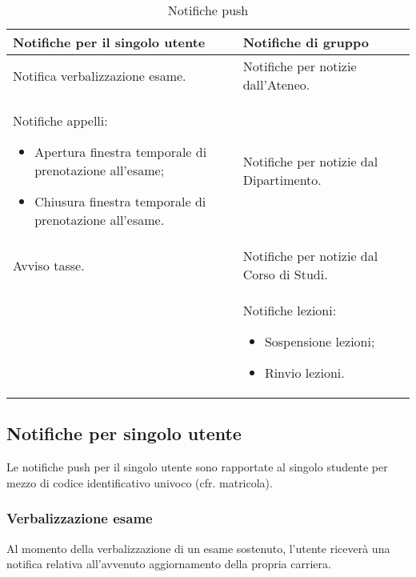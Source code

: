 \begin{table}
\small %
\caption{Notifiche push} %
\label{tab:gruppo-2-notifiche-push} %
\begin{tabular}{| p{} | p{} |}
	\hline
	\textbf{Notifiche per il singolo utente} & \textbf{Notifiche di gruppo} \\
	\hline
	Notifica verbalizzazione esame. & Notifiche per notizie dall'Ateneo. \\
	\hline
	Notifiche appelli:
	\begin{itemize}[noitemsep,topsep=0pt,parsep=0pt,partopsep=0pt]
	\item Apertura finestra temporale di prenotazione all'esame;
	\item Chiusura finestra temporale di prenotazione all'esame.
	\end{itemize} &
	Notifiche per notizie dal Dipartimento. \\
	\hline
	Avviso tasse. & Notifiche per notizie dal Corso di Studi. \\
	\hline
	& Notifiche lezioni:
	\begin{itemize}[noitemsep,topsep=0pt,parsep=0pt,partopsep=0pt]
	\item Sospensione lezioni;
	\item Rinvio lezioni.
	\end{itemize} \\
	\hline
\end{tabular}
\end{table}

\subsection{Notifiche per singolo utente}

Le notifiche push per il singolo utente sono rapportate al singolo studente per mezzo di codice identificativo univoco (cfr. matricola).

\subsubsection{Verbalizzazione esame}

Al momento della verbalizzazione di un esame sostenuto, l’utente riceverà una notifica relativa all’avvenuto aggiornamento della propria carriera.


